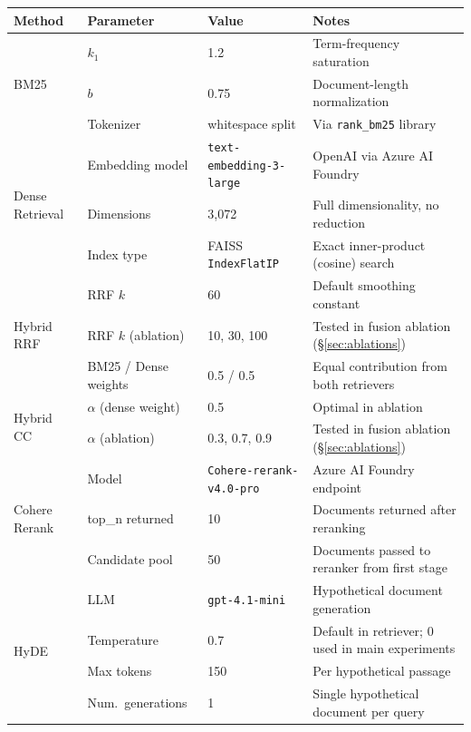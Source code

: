 \documentclass[11pt]{article}
\begin{document}
\begin{table}[ht]
\centering
\scriptsize
\setlength{\tabcolsep}{4pt}
\begin{tabular}{@{}llll@{}}
\toprule
\textbf{Method} & \textbf{Parameter} & \textbf{Value} & \textbf{Notes} \\
\midrule
\multirow{3}{*}{BM25}
  & $k_1$            & 1.2   & Term-frequency saturation \\
  & $b$              & 0.75  & Document-length normalization \\
  & Tokenizer        & whitespace split & Via \texttt{rank\_bm25} library \\
\midrule
\multirow{3}{*}{Dense Retrieval}
  & Embedding model  & \texttt{text-embedding-3-large} & OpenAI via Azure AI Foundry \\
  & Dimensions       & 3{,}072 & Full dimensionality, no reduction \\
  & Index type       & FAISS \texttt{IndexFlatIP} & Exact inner-product (cosine) search \\
\midrule
\multirow{3}{*}{Hybrid RRF}
  & RRF $k$          & 60    & Default smoothing constant \\
  & RRF $k$ (ablation) & 10, 30, 100 & Tested in fusion ablation (\S\ref{sec:ablations}) \\
  & BM25 / Dense weights & 0.5 / 0.5 & Equal contribution from both retrievers \\
\midrule
\multirow{2}{*}{Hybrid CC}
  & $\alpha$ (dense weight) & 0.5 & Optimal in ablation \\
  & $\alpha$ (ablation)     & 0.3, 0.7, 0.9 & Tested in fusion ablation (\S\ref{sec:ablations}) \\
\midrule
\multirow{3}{*}{Cohere Rerank}
  & Model            & \texttt{Cohere-rerank-v4.0-pro} & Azure AI Foundry endpoint \\
  & top\_n returned  & 10    & Documents returned after reranking \\
  & Candidate pool   & 50    & Documents passed to reranker from first stage \\
\midrule
\multirow{4}{*}{HyDE}
  & LLM              & \texttt{gpt-4.1-mini} & Hypothetical document generation \\
  & Temperature      & 0.7   & Default in retriever; 0 used in main experiments \\
  & Max tokens       & 150   & Per hypothetical passage \\
  & Num.\ generations & 1    & Single hypothetical document per query \\

\end{tabular}
\end{table}
\end{document}
